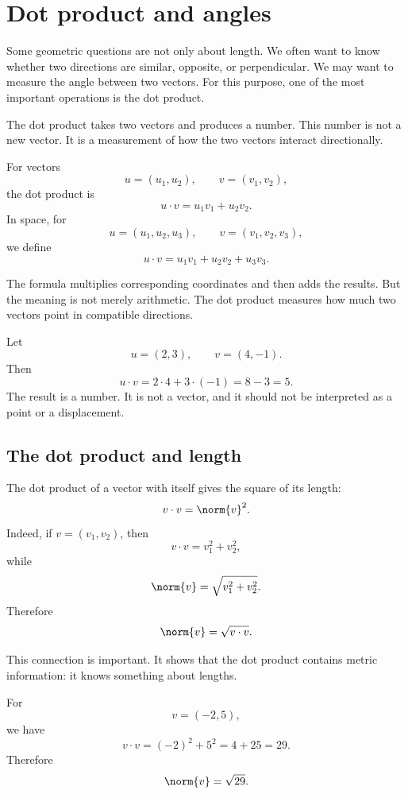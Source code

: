 \section{Dot product and angles}

Some geometric questions are not only about length. We often want to know whether two directions are similar, opposite, or perpendicular. We may want to measure the angle between two vectors. For this purpose, one of the most important operations is the dot product.

The dot product takes two vectors and produces a number. This number is not a new vector. It is a measurement of how the two vectors interact directionally.

\begin{definitionbox}
For vectors
\[
u=(u_1,u_2),
\qquad
v=(v_1,v_2),
\]
the dot product is
\[
u\cdot v=u_1v_1+u_2v_2.
\]
In space, for
\[
u=(u_1,u_2,u_3),
\qquad
v=(v_1,v_2,v_3),
\]
we define
\[
u\cdot v=u_1v_1+u_2v_2+u_3v_3.
\]
\end{definitionbox}

The formula multiplies corresponding coordinates and then adds the results. But the meaning is not merely arithmetic. The dot product measures how much two vectors point in compatible directions.

\begin{examplebox}
Let
\[
u=(2,3),
\qquad
v=(4,-1).
\]
Then
\[
u\cdot v=2\cdot4+3\cdot(-1)=8-3=5.
\]
The result is a number. It is not a vector, and it should not be interpreted as a point or a displacement.
\end{examplebox}

\subsection*{The dot product and length}

The dot product of a vector with itself gives the square of its length:
\[
v\cdot v=\norm{v}^2.
\]
Indeed, if \(v=(v_1,v_2)\), then
\[
v\cdot v=v_1^2+v_2^2,
\]
while
\[
\norm{v}=\sqrt{v_1^2+v_2^2}.
\]
Therefore
\[
\norm{v}=\sqrt{v\cdot v}.
\]

This connection is important. It shows that the dot product contains metric information: it knows something about lengths.

\begin{examplebox}
For
\[
v=(-2,5),
\]
we have
\[
v\cdot v=(-2)^2+5^2=4+25=29.
\]
Therefore
\[
\norm{v}=\sqrt{29}.
\]
\end{examplebox}

